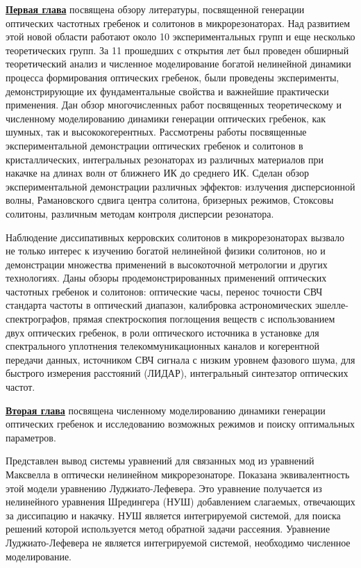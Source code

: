 \underline{\textbf{Первая глава}} посвящена обзору литературы, посвященной генерации оптических частотных гребенок и солитонов в микрорезонаторах. Над развитием этой новой области работают около 10 экспериментальных групп и еще несколько теоретических групп. За 11 прошедших с открытия лет был проведен обширный теоретический анализ и численное моделирование богатой нелинейной динамики процесса формирования оптических гребенок, были проведены эксперименты, демонстрирующие их фундаментальные свойства и важнейшие практически применения. Дан обзор многочисленных работ посвященных теоретическому и численному моделированию динамики генерации оптических гребенок, как шумных, так и высококогерентных. Рассмотрены работы посвященные экспериментальной демонстрации оптических гребенок и солитонов в кристаллических, интегральных резонаторах из различных материалов при накачке на длинах волн от ближнего ИК до среднего ИК. Сделан обзор экспериментальной демонстрации различных эффектов: излучения дисперсионной волны, Рамановского сдвига центра солитона, бризерных режимов, Стоксовы солитоны, различным методам контроля дисперсии резонатора.

Наблюдение диссипативных керровских солитонов в микрорезонаторах вызвало не только интерес к изучению богатой нелинейной физики солитонов, но и демонстрации множества применений в высокоточной метрологии и других технологиях. Даны обзоры продемонстрированных применений оптических частотных гребенок и солитонов: оптические часы, перенос точности СВЧ стандарта частоты в оптический диапазон, калибровка астрономических эшелле-спектрографов, прямая спектроскопия поглощения веществ с использованием двух оптических гребенок, в роли оптического источника в установке для спектрального уплотнения телекоммуникационных каналов и когерентной передачи данных, источником СВЧ сигнала с низким уровнем фазового шума, для быстрого измерения расстояний (ЛИДАР), интегральный синтезатор оптических частот.

\underline{\textbf{Вторая глава}} посвящена численному моделированию динамики генерации оптических гребенок и исследованию возможных режимов и поиску оптимальных параметров.

Представлен вывод системы уравнений для связанных мод из уравнений Максвелла в оптически нелинейном микрорезонаторе. Показана эквивалентность этой модели уравнению Луджиато-Лефевера. Это уравнение получается из нелинейного уравнения Шредингера (НУШ) добавлением слагаемых, отвечающих за диссипацию и накачку. НУШ является интегрируемой системой, для поиска решений которой используется метод обратной задачи рассеяния. Уравнение Луджиато-Лефевера не является интегрируемой системой, необходимо численное моделирование.

